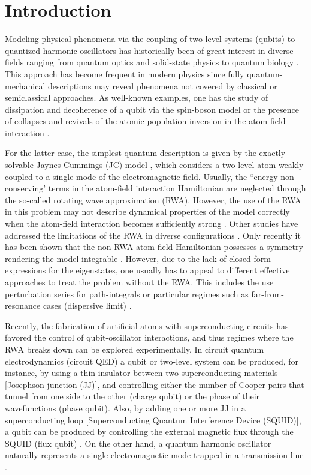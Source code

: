 \documentclass[%
reprint,
amsmath,amssymb,
aps,
pra,
]{revtex4-1}
\begin{document}

\section{\label{sec:level1}Introduction}
Modeling physical phenomena via the coupling of two-level systems (qubits) to quantized harmonic oscillators has historically been of great interest in diverse fields ranging from quantum optics \cite{kni05,jc63,ebly80,kni82} and solid-state physics \cite{mah90, wei08} to quantum biology \cite{sch15,qbio13,ore14,gil05}. This approach has become frequent in modern physics since fully quantum-mechanical descriptions may reveal phenomena not covered by classical or semiclassical approaches. As well-known examples, one has the study of dissipation and decoherence of a qubit via the spin-boson model \cite{leg87} or the presence of collapses and revivals of the atomic population inversion in the atom-field interaction \cite{ebly80, kni82}.

For the latter case, the simplest quantum description is given by the exactly solvable Jaynes-Cummings (JC) model \cite{jc63}, which considers a two-level atom weakly coupled to a single mode of the electromagnetic field. Usually, the ``energy non-conserving' terms in the atom-field interaction Hamiltonian are neglected through the so-called rotating wave approximation (RWA). However, the use of the RWA in this problem may not describe dynamical properties of the model correctly when the atom-field interaction becomes sufficiently strong \cite{zub87, nad11}. Other studies have addressed the limitations of the RWA in diverse configurations \cite{hu10,hau10,hau08,aga71,liao16,sor04,ebly12}.  Only recently it has been shown that the non-RWA atom-field Hamiltonian possesses a symmetry rendering the model integrable \cite{Braak}. However, due to the lack of closed form expressions for the eigenstates, one usually has to appeal to different effective approaches to treat the problem without the RWA. This includes the use perturbation series for path-integrals \cite{zub87} or particular regimes such as far-from-resonance cases (dispersive limit) \cite{zue09}. 

Recently, the fabrication of artificial atoms with superconducting circuits \cite{cla08,gir08,wall04,bla04,bla07,scho07} has favored the control of qubit-oscillator interactions, and thus regimes where the RWA breaks down can be explored experimentally. In circuit quantum electrodynamics (circuit QED) a qubit or two-level system can be produced, for instance, by using a thin insulator between two superconducting materials [Josephson junction (JJ)], and controlling either the number of Cooper pairs that tunnel from one side to the other (charge qubit) or the phase of their wavefunctions (phase qubit). Also, by adding one or more JJ in a superconducting loop [Superconducting Quantum Interference Device (SQUID)], a qubit can be produced by controlling the external magnetic flux through the SQUID (flux qubit) \cite{cla08,gir08}. On the other hand, a quantum harmonic oscillator naturally represents a single electromagnetic mode trapped in a transmission line \cite{gir08,bla04}.
\end{document}

